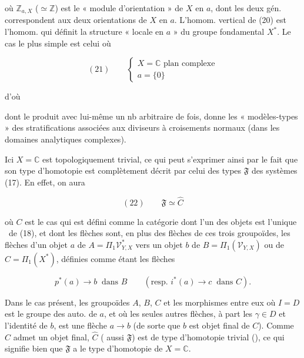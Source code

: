 \documentclass[11pt,a4paper]{article}
\begin{document}
où $\mathbb{Z}_{a,X}$ ($\simeq \mathbb{Z}$) est le « module d'orientation » de
$X$ en $a$, dont les deux gén. correspondent aux deux orientations de $X$ en
$a$. L'homom. vertical de (20) est l'homom. qui définit la structure « locale
en $a$ » du groupe fondamental $X^{*}$. Le cas le plus simple est celui où

\[
  (21) \qquad \begin{cases} X = \mathbb{C} \text{ plan complexe} \\ a = \{0\} \end{cases}
\]

d'où


dont le produit avec lui-même un nb arbitraire de fois, donne les
« modèles-types » des stratifications associées aux diviseurs à croisements
normaux (dans les  domaines analytiques complexes).

Ici $X = \mathbb{C}$ est topologiquement trivial, ce qui peut s'exprimer ainsi
par le fait que son type d'homotopie est complètement décrit par celui des
types $\mathfrak{F}$ des systèmes (17). En effet, on aura

\[
  (22) \qquad \mathfrak{F} \simeq \widehat{C}
\]

où $C$ est le cas qui est 
défini comme la catégorie dont l'un des objets est l'unique \ill\ de (18), et
dont les flèches sont, en plus des flèches de ces trois groupoïdes, les
flèches d'un objet $a$ de $A = \Pi_1\mathcal{V}^{*}_{Y,X}$ vers un objet $b$
de $B = \Pi_1(\mathcal{V}_{Y,X})$ ou de $C = \Pi_1(X^{*})$, définies comme
étant les flèches

\[
  p^{*}(a) \longrightarrow b \ \text{ dans } B
  \qquad (\text{resp. } i^{*}(a) \longrightarrow c \ \text{ dans } C).
\]


Dans le cas  présent, les groupoïdes $A$, $B$, $C$ et les
morphismes entre eux   où
$I = D$ est le groupe des auto. de $a$, et où les seules autres flèches, à part
les $\gamma \in D$ et l'identité de $b$, est une flèche $a \to b$ (de sorte que
$b$ est objet final de $C$). Comme $C$ admet un objet final, $\widehat{C}$
 ( aussi $\mathfrak{F}$) est de type d'homotopie
trivial (), ce qui signifie bien
que $\mathfrak{F}$ a le type d'homotopie de  $X = \mathbb{C}$.
\end{document}
